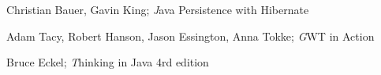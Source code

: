 \begin{thebibliography}{99}
Christian Bauer, Gavin King;
\textit Java Persistence with Hibernate

Adam Tacy, Robert Hanson, Jason Essington, Anna Tokke;
\textit GWT in Action

Bruce Eckel;
\textit Thinking in Java 4rd edition
\end{thebibliography}
